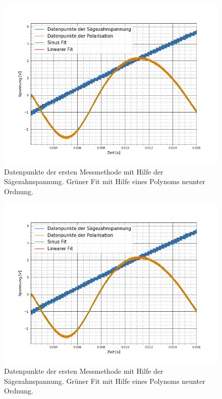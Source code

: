 \begin{figure}[ht]
	\includegraphics[scale=0.5]{Bild/V1_11}
	\centering
	\caption[Plot zu Versuchsteil 1 Nr.11]{Datenpunkte der ersten Messmethode mit Hilfe der Sägezahnspannung. Grüner Fit mit Hilfe eines Polynoms neunter Ordnung.}
\end{figure}
\begin{figure}[ht]
	\includegraphics[scale=0.5]{Bild/V1_12}
	\centering
	\caption[Plot zu Versuchsteil 1 Nr.12]{Datenpunkte der ersten Messmethode mit Hilfe der Sägezahnspannung. Grüner Fit mit Hilfe eines Polynoms neunter Ordnung.}
\end{figure}
